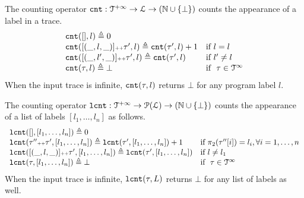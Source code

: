 \begin{defn}
 \label{def:counter}
The counting operator $\mathtt{cnt} : \mathcal{T}^{+\infty} \to \mathcal{L} \to (\mathbb{N} \cup \{\bot\})$
counts the appearance of a label in a trace.
\[
\begin{array}{ll}
 \mathtt{cnt}({[]}, l) \triangleq 0 
 \\
 \mathtt{cnt}([(\_, l, \_)] {\scriptscriptstyle ++} \mathtt{\tau}', l ) \triangleq \mathtt{cnt}(\mathtt{\tau}', l) + 1 & \text{if}~ l = l
 \\
 \mathtt{cnt}([(\_, l', \_)] {\scriptscriptstyle ++} \mathtt{\tau}', l) \triangleq \mathtt{cnt}(\mathtt{\tau}', l) & \text{if}~ l' \neq l
 \\
 \mathtt{cnt}(\mathtt{\tau}, l) \triangleq \bot & \text{if }~ \mathtt{\tau} \in \mathcal{T}^{\infty}
\end{array}
\]{When the input trace is infinite, $\mathtt{cnt}(\mathtt{\tau}, l)$ returns $\bot$ for any program label $l$.}
\end{defn}
\begin{defn}
 \label{def:lcounter}
 The counting operator $\mathtt{lcnt} : \mathcal{T}^{+\infty} \to \mathcal{P}(\mathcal{L}) \to (\mathbb{N} \cup \{\bot\})$
 counts the appearance of a list of labels $[l_1, \ldots, l_n]$ as follows.
\[
 \begin{array}{ll}
\mathtt{lcnt}([], [l_1, \ldots, l_n] ) 
\triangleq 0 & 
\\ 
\mathtt{lcnt}(\mathtt{\tau}'' {\scriptscriptstyle ++} \mathtt{\tau}', [l_1, \ldots, l_n] ) 
 \triangleq \mathtt{lcnt}(\mathtt{\tau}', [l_1, \ldots, l_n]) + 1 & \text{if}~ \pi_2(\mathtt{\tau}''[i]) = l_i, \forall i = 1, \ldots, n
 \\ 
 \mathtt{lcnt}([(\_, l, \_)] {\scriptscriptstyle ++} \mathtt{\tau}', [l_1, \ldots, l_n] ) 
 \triangleq \mathtt{lcnt}(\mathtt{\tau}', [l_1, \ldots, l_n]) & \text{if}~ l \neq l_1
 \\ 
 \mathtt{lcnt}(\mathtt{\tau}, [l_1, \ldots, l_n] ) 
 \triangleq \bot & \text{if }~ \mathtt{\tau} \in \mathcal{T}^{\infty}
\end{array}
\]
{When the input trace is infinite, $\mathtt{lcnt}(\mathtt{\tau}, L)$ returns $\bot$ for any list of labels as well.}
\end{defn}
